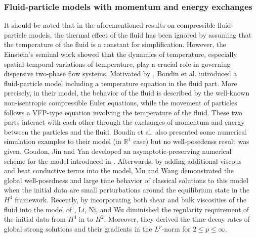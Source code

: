\documentclass[reqno,11pt]{amsart}
\theoremstyle{plain}
\numberwithin{equation}{section}
\begin{document}
\subsubsection{Fluid-particle models with momentum and energy exchanges}
It should be noted   that in the   
 aforementioned     results 
on  compressible fluid-particle models,   the   thermal effect  of the fluid  has been 
 ignored by assuming that the temperature of  {the} fluid is a constant for simplification.
However, the  Einstein's  {seminal} work \cite{Ei-1905} showed   that the dynamics of  
 temperature, especially spatial-temporal variations of temperature,  play  a  crucial
  role in governing   dispersive two-phase flow systems. 
Motivated by \cite{Ei-1905}, Boudin et al. \cite{BBBGLLM-esaim-2009} introduced a
 fluid-particle model  including a temperature equation in the fluid part. 
More precisely, in their model, the behavior of the fluid is described by the well-known 
 non-isentropic compressible Euler equations, while the movement of particles follows a 
 VFP-type equation involving the temperature of the fluid. These two parts interact 
 with each other through the exchanges of momentum and energy
between the particles and the fluid. Boudin et al. \cite{BBBGLLM-esaim-2009} also presented some numerical 
simulation examples to their model (in $\mathbb{R}^1$ case) but no well-posedenss result was given. 
 Goudon, Jin  {and} Yan \cite{GJY-cms-2012}
developed an asymptotic-preserving numerical scheme for the model introduced in \cite{BBBGLLM-esaim-2009}.
Afterwards, by adding additional   viscous and heat  conductive   terms  into the model, 
Mu and Wang \cite{Mu-Wang-20} demonstrated the global well-posedness and large time 
behavior of classical solutions
to this model when the initial data are   small perturbations around the equilibrium 
state in the  $H^4$ framework.
Recently,  by incorporating  both shear and bulk viscosities of the fluid   into  
the model of \cite{BBBGLLM-esaim-2009}, Li, Ni, and  Wu  \cite{LNW-arXiv-2025} 
diminished the regularity requirement of the initial data from $H^4$ in \cite{Mu-Wang-20} 
 to $H^2$. Moreover, they derived the time decay rates of global strong solutions and their gradients in the 
 $L^p$-norm for $2 \leq p \leq \infty$. 
 
\end{document}

